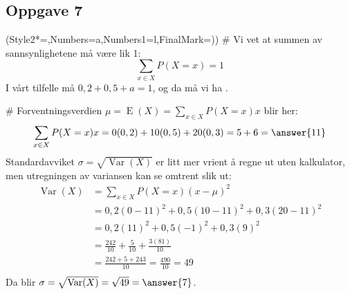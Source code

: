 \subsection*{Oppgave 7}
\begin{easylist}[enumerate]
	\ListProperties(Style2*=,Numbers=a,Numbers1=l,FinalMark={)})
	# Vi vet at summen av sannsynlighetene må være lik 1:
	\begin{equation*}
		\sum_{x \in X} P(X= x) = 1
	\end{equation*}
	I vårt tilfelle må $0,2 + 0,5 + a = 1$, og da må vi ha .
	
	# Forventningsverdien $\mu = \operatorname{E}(X) = \sum_{x \in X} P(X =x)x$ blir her:
	\begin{equation*}
	\sum_{x \in X} P(X =x)x = 0 (0,2) + 10 (0,5) + 20 (0,3) = 5 + 6 = \answer{11}
	\end{equation*}
	Standardavviket $\sigma = \sqrt{\operatorname{Var}(X)}$ er litt mer vrient å regne ut uten kalkulator, men utregningen av variansen kan se omtrent slik ut:
	\begin{align*}
	\operatorname{Var}(X) &= \sum_{x \in X} P(X =x)(x - \mu)^2 \\
	&= 0,2(0-11)^2 + 0,5(10-11)^2 +  0,3(20-11)^2 \\
	&= 0,2(11)^2 + 0,5(-1)^2 +  0,3(9)^2 \\
	&= \frac{242}{10} + \frac{5}{10} +  \frac{3(81)}{10} \\
	&= \frac{242+5+243}{10} = \frac{490}{10} = 49 \\
	\end{align*}
	Da blir $\sigma = \sqrt{\operatorname{Var}(X)} = \sqrt{49} = \answer{7}$.
\end{easylist}

